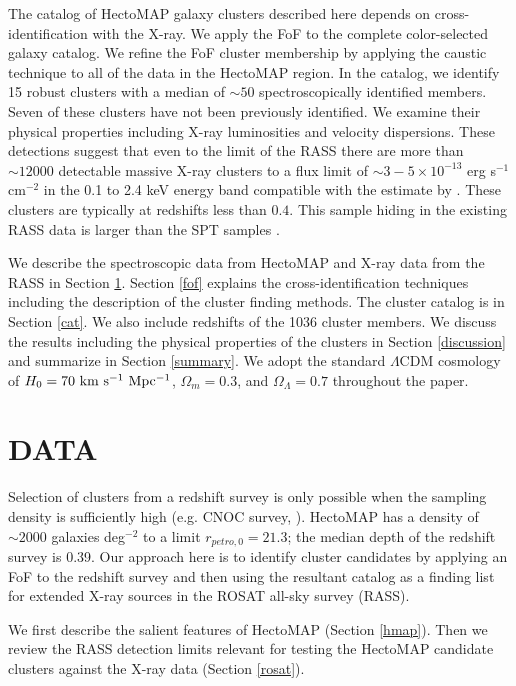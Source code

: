\documentclass[iop, apj]{emulateapj}
\newcommand{\kmsmpc}{\rm km~s^{-1}~Mpc^{-1}}
\begin{document}
The catalog of HectoMAP galaxy clusters described here depends on
 cross-identification with the X-ray. 
We apply the FoF to the complete color-selected galaxy catalog. 
We refine the FoF cluster membership by applying the caustic technique to all of the data in the HectoMAP region.
In the catalog, 
 we identify 15 robust clusters with a median of $\sim 50$ spectroscopically identified members. 
Seven of these clusters have not been previously identified.
We examine their physical properties 
 including X-ray luminosities and velocity dispersions. 
These detections suggest that 
 even to the limit of the RASS 
 there are more than $\sim12000$ detectable massive X-ray clusters
 to a flux limit of $\sim 3 - 5 \times 10^{-13}$ erg s$^{-1}$ cm$^{-2}$ in the 0.1 to 2.4 keV energy band 
 compatible with the estimate by \citet{Schuecker04}.
These clusters are typically at redshifts less than $0.4$. 
This sample hiding in the existing RASS data is larger than the SPT samples \citep{Bleem15}.
 
We describe the spectroscopic data from HectoMAP 
 and X-ray data from the RASS in Section \ref{data}. 
Section \ref{fof} explains the cross-identification techniques
 including the description of the cluster finding methods. 
The cluster catalog is in Section \ref{cat}. 
We also include redshifts of the 1036 cluster members. 
We discuss the results including the physical properties of the clusters in Section \ref{discussion}
 and summarize in Section \ref{summary}. 
We adopt the standard $\Lambda$CDM cosmology of 
 $H_{0} = 70~\kmsmpc$, $\Omega_{m} = 0.3$, and $\Omega_{\Lambda} = 0.7$
 throughout the paper. 

\section{DATA}\label{data}

Selection of clusters from a redshift survey is 
 only possible when the sampling density is sufficiently high 
 (e.g. CNOC survey, \citealp{Yee96}).
HectoMAP has a density of $\sim 2000$ galaxies deg$^{-2}$ to a limit $r_{petro, 0} = 21.3$; 
 the median depth of the redshift survey is 0.39. 
Our approach here is to identify cluster candidates by applying an FoF to the redshift survey and 
 then using the resultant catalog as a finding list for extended X-ray sources in the ROSAT all-sky survey (RASS).

We first describe the salient features of HectoMAP (Section \ref{hmap}). 
Then we review the RASS detection limits relevant 
 for testing the HectoMAP candidate clusters against the X-ray data (Section \ref{rosat}).  
\end{document}
